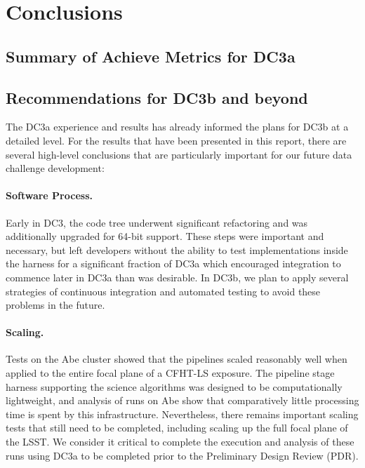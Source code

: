 
\section{Conclusions}

\subsection{Summary of Achieve Metrics for DC3a}

\subsection{Recommendations for DC3b and beyond}

The DC3a experience and results has already informed the plans for
DC3b at a detailed level.  For the results that have been presented in
this report, there are several high-level conclusions that are
particularly important for our future data challenge development:

\paragraph{Software Process.}  Early in DC3, the code tree underwent
significant refactoring and was additionally upgraded for 64-bit
support. These steps were important and necessary, but left developers
without the ability to test implementations inside the harness for a
significant fraction of DC3a which encouraged integration to commence
later in DC3a than was desirable.  In DC3b, we plan to apply several
strategies of continuous integration and automated testing to avoid
these problems in the future.  

\paragraph{Scaling.}  Tests on the Abe cluster showed that the
pipelines scaled reasonably well when applied to the entire focal
plane of a CFHT-LS exposure. The pipeline stage harness supporting the
science algorithms was designed to be computationally lightweight, and
analysis of runs on Abe show that comparatively little processing time
is spent by this infrastructure.  Nevertheless, there remains
important scaling tests that still need to be completed, including
scaling up the full focal plane of the LSST.  We consider it critical
to complete the execution and analysis of these runs using DC3a to be
completed prior to the Preliminary Design Review (PDR).  

